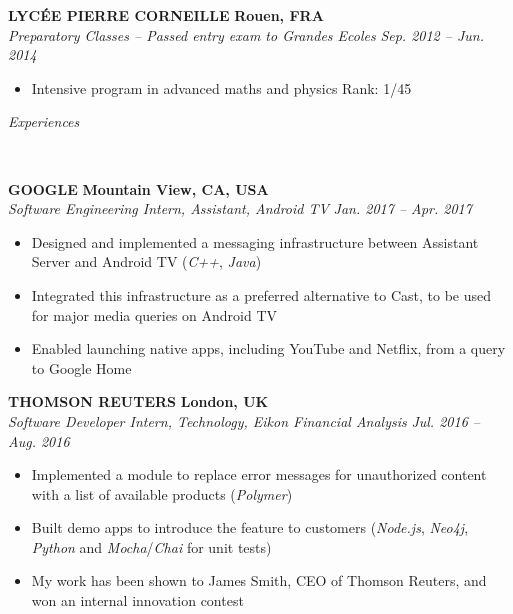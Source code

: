 \documentclass[a4paper, 12pt]{article}
\newcommand{\marginline}{-0.3cm}
\newcommand{\margincontent}{-0.6cm}
\newcommand{\marginbeforesection}{0.45cm}
\newcommand{\linewidthperso}{0.02cm}
\newcommand{\styletitle}[1]{\textbf{#1}}
\newcommand{\styledesc}[1]{\textit{#1}}
\newcommand{\styleloc}[1]{\textbf{#1}}
\newcommand{\styledates}[1]{\textit{#1}}
\newcommand{\stylesection}[1]{
  \vspace{\marginbeforesection}
  \begin{normalsize}\textit{#1}\end{normalsize}
  \vspace{\marginline}\\
  \noindent\makebox[\linewidth]{\rule{\textwidth}{\linewidthperso}}

}
\begin{document}
\begin{footnotesize}
\styletitle{LYC\'EE PIERRE CORNEILLE} \hfill \styleloc{Rouen, FRA}\\
\styledesc{Preparatory Classes -- Passed entry exam to Grandes Ecoles} \hfill \styledates{Sep. 2012 -- Jun. 2014}\\
\vspace{\margincontent}
\begin{itemize}
  \item Intensive program in advanced maths and physics \hfill Rank: 1/45
\end{itemize}

\stylesection{Experiences}

\styletitle{GOOGLE} \hfill \styleloc{Mountain View, CA, USA}\\ 
\styledesc{Software Engineering Intern, Assistant, Android TV} \hfill \styledates{Jan. 2017 -- Apr. 2017}\\
\vspace{\margincontent}
\begin{itemize}
  \item Designed and implemented a messaging infrastructure between Assistant Server and Android TV (\textit{C++}, \textit{Java})
  \item Integrated this infrastructure as a preferred alternative to Cast, to be used for major media queries on Android TV
  \item Enabled launching native apps, including YouTube and Netflix, from a query to Google Home
\end{itemize}

\styletitle{THOMSON REUTERS} \hfill \styleloc{London, UK}\\ 
\styledesc{Software Developer Intern, Technology, Eikon Financial Analysis} \hfill \styledates{Jul. 2016 -- Aug. 2016}\\
\vspace{\margincontent}
\begin{itemize}
  \item Implemented a module to replace error messages for unauthorized content with a list of available products (\textit{Polymer})
  \item Built demo apps to introduce the feature to customers (\textit{Node.js}, \textit{Neo4j}, \textit{Python} and \textit{Mocha}/\textit{Chai} for unit tests)
  \item My work has been shown to James Smith, CEO of Thomson Reuters, and won an internal innovation contest
\end{itemize}


\end{footnotesize}
\end{document}
